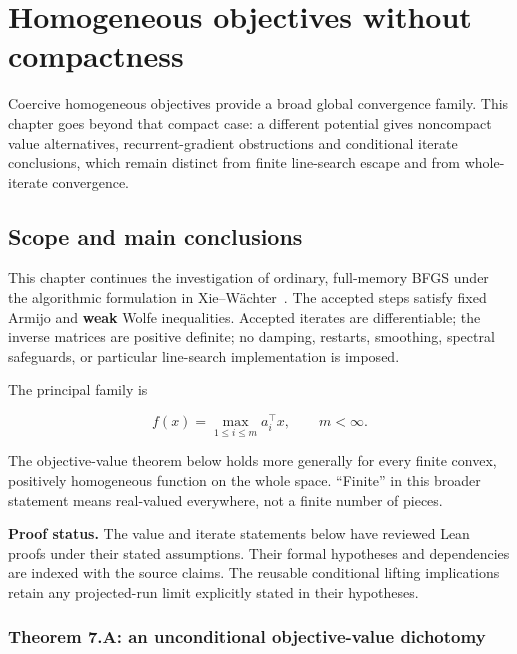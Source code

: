 \chapter{Homogeneous objectives without compactness}\label{comp:H}\label{H:chapter}
\renewcommand{\ModuleTag}{7}
Coercive homogeneous objectives provide a broad global convergence family. This chapter goes beyond that compact case: a different potential gives noncompact value alternatives, recurrent-gradient obstructions and conditional iterate conclusions, which remain distinct from finite line-search escape and from whole-iterate convergence.


\begingroup

\setcounter{section}{0}
\setcounter{theorem}{0}
\setcounter{lemma}{0}
\setcounter{corollary}{0}
\setcounter{proposition}{0}
\setcounter{remark}{0}
\setcounter{equation}{0}


\section{Scope and main
conclusions}\label{H:scope-and-main-conclusions}

This chapter continues the investigation of ordinary, full-memory BFGS
under the algorithmic formulation in Xie--W\"achter~\cite{XW}. The accepted
steps satisfy fixed Armijo and \textbf{weak} Wolfe inequalities.
Accepted iterates are differentiable; the inverse matrices are positive
definite; no damping, restarts, smoothing, spectral safeguards, or
particular line-search implementation is imposed.

The principal family is

\[
f(x)=\max_{1\le i\le m}a_i^\top x,\qquad m<\infty.
\]

The objective-value theorem below holds more generally for every finite
convex, positively homogeneous function on the whole space. ``Finite''
in this broader statement means real-valued everywhere, not a finite
number of pieces.

\textbf{Proof status.} The value and iterate statements below have reviewed Lean proofs under their stated assumptions. Their formal hypotheses and dependencies are indexed with the source claims. The reusable conditional lifting implications retain any projected-run limit explicitly stated in their hypotheses.



\subsection{Theorem 7.A: an unconditional objective-value
dichotomy}\label{H:theorem-a-an-unconditional-objective-value-dichotomy}

